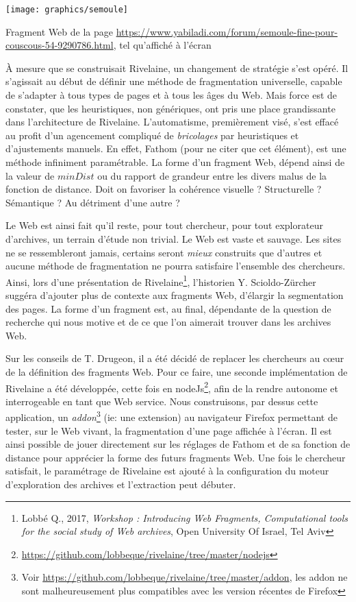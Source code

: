\documentclass[symmetric,justified,marginals=raggedouter]{tufte-book}
\begin{document}
\begin{marginfigure}%
  \texttt{[image: graphics/semoule]}
  \vspace*{0.2cm}  
  \caption{Fragment Web de la page \url{https://www.yabiladi.com/forum/semoule-fine-pour-couscous-54-9290786.html}, tel qu'affiché à l'écran}
  \label{fig:semoule}
\end{marginfigure}

\noindent À mesure que se construisait Rivelaine, un changement de stratégie s'est opéré. Il s'agissait au début de définir une méthode de fragmentation universelle, capable de s'adapter à tous types de pages et à tous les âges du Web. Mais force est de constater, que les heuristiques, non génériques, ont pris une place grandissante dans l'architecture de Rivelaine. L'automatisme, premièrement visé, s'est effacé au profit d'un agencement compliqué de \textit{bricolages} par heuristiques et d'ajustements manuels. En effet, Fathom (pour ne citer que cet élément), est une méthode infiniment paramétrable. La forme d'un fragment Web, dé\-pend ainsi de la valeur de $minDist$ ou du rapport de grandeur entre les divers malus de la fonction de distance. Doit on favoriser la cohérence visuelle ? Structurelle ? Sémantique ? Au détriment d'une autre ? 

Le Web est ainsi fait qu'il reste, pour tout chercheur, pour tout explorateur d'archives, un terrain d'étude non trivial. Le Web est vaste et sauvage. Les sites ne se ressembleront jamais, certains seront \textit{mieux} construits que d'autres et aucune méthode de fragmentation ne pourra satisfaire l'ensemble des chercheurs. Ainsi, lors d'une présentation de Rivelaine\footnote{Lobbé Q., 2017, \textit{Workshop : Introducing Web Fragments, Computational tools for the social study of Web archives}, Open University Of Israel, Tel Aviv}, l'historien Y. Scioldo-Zürcher suggéra d'ajouter plus de contexte aux fragments Web, d'élargir la segmentation des pages. La forme d'un fragment est, au final, dépendante de la question de recherche qui nous motive et de ce que l'on aimerait trouver dans les archives Web.

Sur les conseils de T. Drugeon, il a été décidé de replacer les cher\-cheurs au cœur de la définition des fragments Web. Pour ce faire, une seconde implémentation de Rivelaine a été développée, cette fois en nodeJs\footnote{\url{https://github.com/lobbeque/rivelaine/tree/master/nodejs}}, afin de la rendre autonome et interrogeable en tant que Web service. Nous construisons, par dessus cette application, un \textit{addon}\footnote{Voir \url{https://github.com/lobbeque/rivelaine/tree/master/addon}, les addon ne sont malheureusement plus compatibles avec les version récentes de Firefox} (ie: une extension) au navigateur Firefox permettant de tester, sur le Web vivant, la fragmentation d'une page affichée à l'écran. Il est ainsi possible de jouer directement sur les réglages de Fathom et de sa fonction de distance pour apprécier la forme des futurs fragments Web. Une fois le chercheur satisfait, le paramétrage de Rivelaine est ajouté à la configuration du moteur d'exploration des archives et l'extraction peut débuter.     
\end{document}
